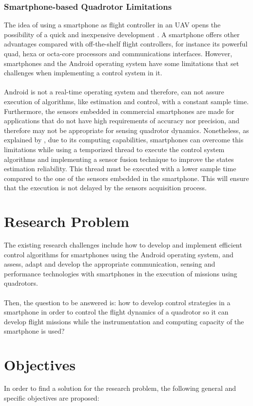\subsubsection{Smartphone-based Quadrotor Limitations}
The idea of using a smartphone as flight controller in an UAV opens the possibility of a quick and inexpensive development \cite{Aldrovandi2015}. A smartphone offers other advantages compared with off-the-shelf flight controllers, for instance its powerful quad, hexa or octa-core processors and communications interfaces. However, smartphones and the Android operating system have some limitations that set challenges when implementing a control system in it.\\\\
Android is not a real-time operating system and therefore, can not assure execution of algorithms, like estimation and control, with a constant sample time. Furthermore, the sensors embedded in commercial smartphones are made for applications that do not have high requirements of accuracy nor precision, and therefore may not be appropriate for sensing quadrotor dynamics. Nonetheless, as explained by \cite{Bryant2015}, due to its computing capabilities, smartphones can overcome this limitations while using a temporized thread to execute the control system algorithms and implementing a sensor fusion technique to improve the states estimation reliability. This thread must be executed with a lower sample time compared to the one of the sensors embedded in the smartphone. This will ensure that the execution is not delayed by the sensors acquisition process.


\section{Research Problem}
The existing research challenges include how to develop and implement efficient control algorithms for smartphones using the Android operating system, and assess, adapt and develop the appropriate communication, sensing and performance technologies with smartphones in the execution of missions using quadrotors.
\\\\
Then, the question to be answered is: how to develop control strategies in a smartphone in order to control the flight dynamics of a quadrotor so it can develop flight missions while the instrumentation and computing capacity of the smartphone is used?
\section{Objectives}
In order to find a solution for the research problem, the following general and specific objectives are proposed:
